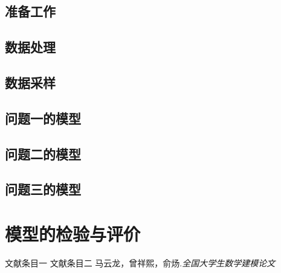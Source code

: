 \subsection*{准备工作}
\subsection*{数据处理}
\subsection*{数据采样}
\subsection*{问题一的模型}
\subsection*{问题二的模型}
\subsection*{问题三的模型}

\section{模型的检验与评价}


\begin{thebibliography}{9}
	文献条目一
	文献条目二
	马云龙，曾祥熙，俞炀.\emph{全国大学生数学建模论文}
\end{thebibliography}

